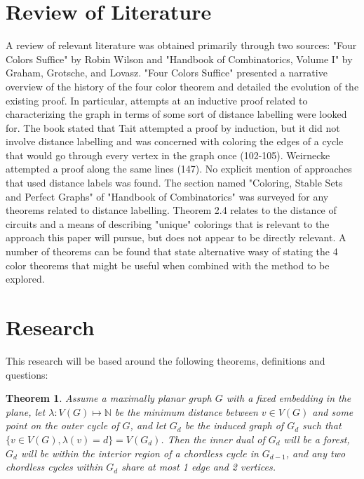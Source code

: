 \documentclass{report}
\theoremstyle{plain}
\newtheorem{thm}{Theorem}[chapter] %
\theoremstyle{definition}
\begin{document}
\vspace{.75in}
\section*{Review of Literature}

A review of relevant literature was obtained primarily through two sources: "Four Colors Suffice" by Robin Wilson and "Handbook of Combinatorics, Volume I" by Graham, Grotsche, and Lovasz. "Four Colors Suffice" presented a narrative overview of the history of the four color theorem and detailed the evolution of the existing proof. In particular, attempts at an inductive proof related to characterizing the graph in terms of some sort of distance labelling were looked for. The book stated that Tait attempted a proof by induction, but it did not involve distance labelling and was concerned with coloring the edges of a cycle that would go through every vertex in the graph once (102-105). Weirnecke attempted a proof along the same lines (147). No explicit mention of approaches that used distance labels was found. The section named "Coloring, Stable Sets and Perfect Graphs" of "Handbook of Combinatorics" was surveyed for any theorems related to distance labelling. Theorem 2.4 relates to the distance of circuits and a means of describing "unique" colorings that is relevant to the approach this paper will pursue, but does not appear to be directly relevant. A number of theorems can be found that state alternative wasy of stating the 4 color theorems that might be useful when combined with the method to be explored.

\vspace{.75in}
\section*{Research}

This research will be based around the following theorems, definitions and questions:

\begin{thm}
Assume a maximally planar graph $G$ with a fixed embedding in the plane, let $\lambda: V(G) \mapsto \mathbb N$ be the minimum distance between $v \in V(G)$ and some point on the outer cycle of $G$, and let $G_d$ be the induced graph of $G_d$ such that  $\{ v \in V(G), \lambda(v) = d \} = V(G_d)$. Then the inner dual of $G_d$ will be a forest, $G_d$ will be within the interior region of a chordless cycle in $G_{d-1}$, and any two chordless cycles within $G_d$ share at most 1 edge and 2 vertices.
\end{thm}
\end{document}
